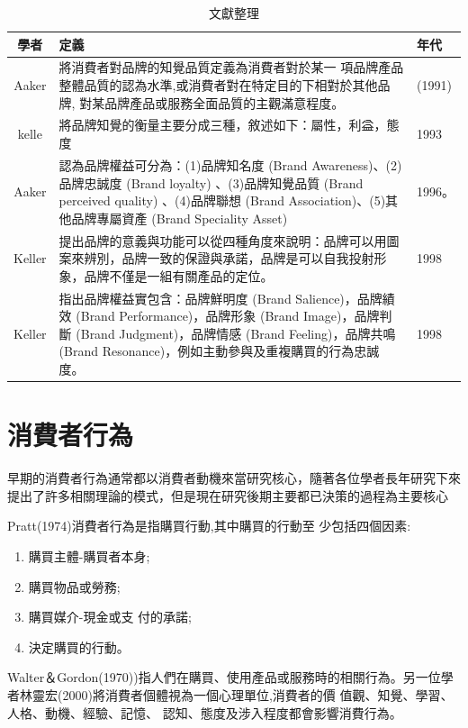 \begin{table}[htb]
\caption{文獻整理}
\label{tab:PL2}
\centering
%
\begin{tabular}[t]{|c|p{8.5cm}|p{2.5cm}|} %
\hline
學者&定義 & 年代 \tabularnewline
\hline
Aaker & 將消費者對品牌的知覺品質定義為消費者對於某一 項品牌產品整體品質的認為水準,或消費者對在特定目的下相對於其他品牌, 對某品牌產品或服務全面品質的主觀滿意程度。& (1991)  \tabularnewline
\hline
kelle&將品牌知覺的衡量主要分成三種，敘述如下：屬性，利益，態度& 1993 \tabularnewline
\hline
Aaker&認為品牌權益可分為：(1)品牌知名度 (Brand Awareness)、(2)品牌忠誠度 (Brand loyalty) 、(3)品牌知覺品質 (Brand perceived quality) 、(4)品牌聯想 (Brand Association)、(5)其他品牌專屬資產 (Brand Speciality Asset) &1996。\tabularnewline
\hline
Keller&提出品牌的意義與功能可以從四種角度來說明：品牌可以用圖案來辨別，品牌一致的保證與承諾，品牌是可以自我投射形象，品牌不僅是一組有關產品的定位。&1998 \tabularnewline
\hline
Keller&指出品牌權益實包含：品牌鮮明度 (Brand Salience)，品牌績效 (Brand Performance)，品牌形象 (Brand Image)，品牌判斷 (Brand Judgment)，品牌情感 (Brand Feeling)，品牌共鳴 (Brand Resonance)，例如主動參與及重複購買的行為忠誠度。&1998 \tabularnewline
\hline
\end{tabular}
\end{table}



\section{消費者行為}
早期的消費者行為通常都以消費者動機來當研究核心，隨著各位學者長年研究下來提出了許多相關理論的模式，但是現在研究後期主要都已決策的過程為主要核心

Pratt(1974)\cite{Pratt1974}消費者行為是指購買行動,其中購買的行動至 少包括四個因素:
\begin{enumerate}
\item 購買主體-購買者本身; 
\item  購買物品或勞務;
\item  購買媒介-現金或支 付的承諾;
\item  決定購買的行動。
\end{enumerate}

Walter＆Gordon(1970)\cite{Walter1970})指人們在購買、使用產品或服務時的相關行為。另一位學者林靈宏(2000)\cite{林靈宏}將消費者個體視為一個心理單位,消費者的價 值觀、知覺、學習、人格、動機、經驗、記憶、 認知、態度及涉入程度都會影響消費行為。


